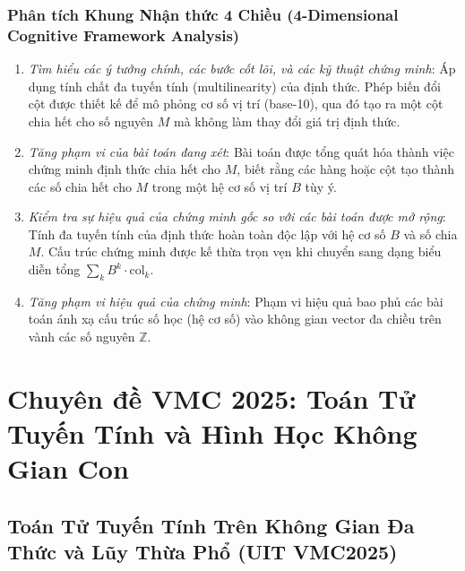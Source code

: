 \documentclass{article}
\begin{document}
\subsubsection*{Phân tích Khung Nhận thức 4 Chiều (4-Dimensional Cognitive Framework Analysis)}
\begin{enumerate}
 \item \textit{Tìm hiểu các ý tưởng chính, các bước cốt lõi, và các kỹ thuật chứng minh}: Áp dụng tính chất đa tuyến tính (multilinearity) của định thức. Phép biến đổi cột được thiết kế để mô phỏng cơ số vị trí (base-10), qua đó tạo ra một cột chia hết cho số nguyên $M$ mà không làm thay đổi giá trị định thức.
 \item \textit{Tăng phạm vi của bài toán đang xét}: Bài toán được tổng quát hóa thành việc chứng minh định thức chia hết cho $M$, biết rằng các hàng hoặc cột tạo thành các số chia hết cho $M$ trong một hệ cơ số vị trí $B$ tùy ý.
 \item \textit{Kiểm tra sự hiệu quả của chứng minh gốc so với các bài toán được mở rộng}: Tính đa tuyến tính của định thức hoàn toàn độc lập với hệ cơ số $B$ và số chia $M$. Cấu trúc chứng minh được kế thừa trọn vẹn khi chuyển sang dạng biểu diễn tổng $\sum_{k} B^k \cdot \text{col}_k$.
 \item \textit{Tăng phạm vi hiệu quả của chứng minh}: Phạm vi hiệu quả bao phủ các bài toán ánh xạ cấu trúc số học (hệ cơ số) vào không gian vector đa chiều trên vành các số nguyên $\mathbb{Z}$.
\end{enumerate}



\section{Chuyên đề VMC 2025: Toán Tử Tuyến Tính và Hình Học Không Gian Con}

\subsection{Toán Tử Tuyến Tính Trên Không Gian Đa Thức và Lũy Thừa Phổ (UIT VMC2025)}
\end{document}
